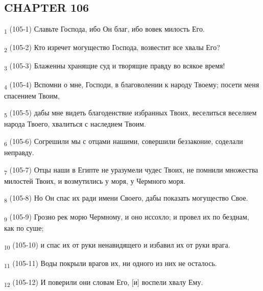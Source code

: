 \subsection{CHAPTER 106}
\begin{tcolorbox}
\textsubscript{1} (105-1) Славьте Господа, ибо Он благ, ибо вовек милость Его.
\end{tcolorbox}
\begin{tcolorbox}
\textsubscript{2} (105-2) Кто изречет могущество Господа, возвестит все хвалы Его?
\end{tcolorbox}
\begin{tcolorbox}
\textsubscript{3} (105-3) Блаженны хранящие суд и творящие правду во всякое время!
\end{tcolorbox}
\begin{tcolorbox}
\textsubscript{4} (105-4) Вспомни о мне, Господи, в благоволении к народу Твоему; посети меня спасением Твоим,
\end{tcolorbox}
\begin{tcolorbox}
\textsubscript{5} (105-5) дабы мне видеть благоденствие избранных Твоих, веселиться веселием народа Твоего, хвалиться с наследием Твоим.
\end{tcolorbox}
\begin{tcolorbox}
\textsubscript{6} (105-6) Согрешили мы с отцами нашими, совершили беззаконие, соделали неправду.
\end{tcolorbox}
\begin{tcolorbox}
\textsubscript{7} (105-7) Отцы наши в Египте не уразумели чудес Твоих, не помнили множества милостей Твоих, и возмутились у моря, у Чермного моря.
\end{tcolorbox}
\begin{tcolorbox}
\textsubscript{8} (105-8) Но Он спас их ради имени Своего, дабы показать могущество Свое.
\end{tcolorbox}
\begin{tcolorbox}
\textsubscript{9} (105-9) Грозно рек морю Чермному, и оно иссохло; и провел их по безднам, как по суше;
\end{tcolorbox}
\begin{tcolorbox}
\textsubscript{10} (105-10) и спас их от руки ненавидящего и избавил их от руки врага.
\end{tcolorbox}
\begin{tcolorbox}
\textsubscript{11} (105-11) Воды покрыли врагов их, ни одного из них не осталось.
\end{tcolorbox}
\begin{tcolorbox}
\textsubscript{12} (105-12) И поверили они словам Его, [и] воспели хвалу Ему.
\end{tcolorbox}
